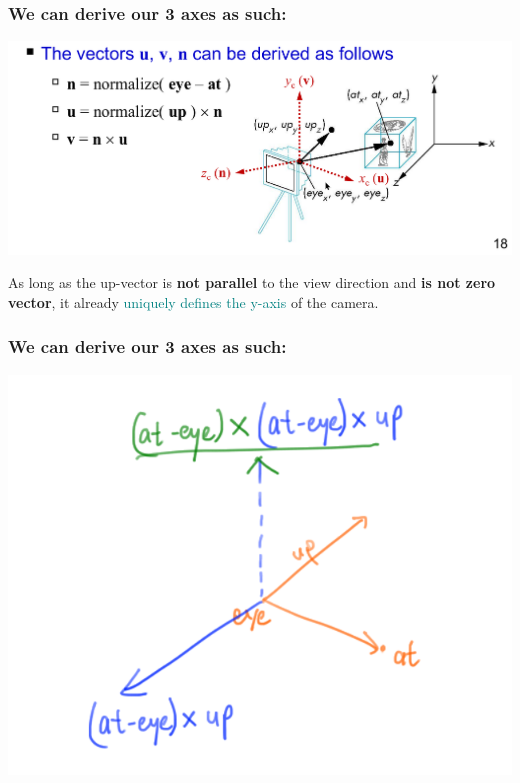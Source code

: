 \documentclass{beamer}
\begin{document}
\begin{frame}
    \frametitle{We can derive our 3 axes as such:}

    \begin{center}
        \includegraphics[scale=0.3]{glulookat.png}
    \end{center}

    \begin{tcolorbox}
        As long as the up-vector is \textbf{not parallel} to the view direction and 
        \textbf{is not zero vector}, it already \textcolor{teal}{uniquely defines the y-axis} of the camera.
    \end{tcolorbox}

\end{frame}

\begin{frame}
    \frametitle{We can derive our 3 axes as such:}

    \begin{center}
        \includegraphics[scale=1.3]{q3.png}
    \end{center}

\end{frame}
\end{document}
